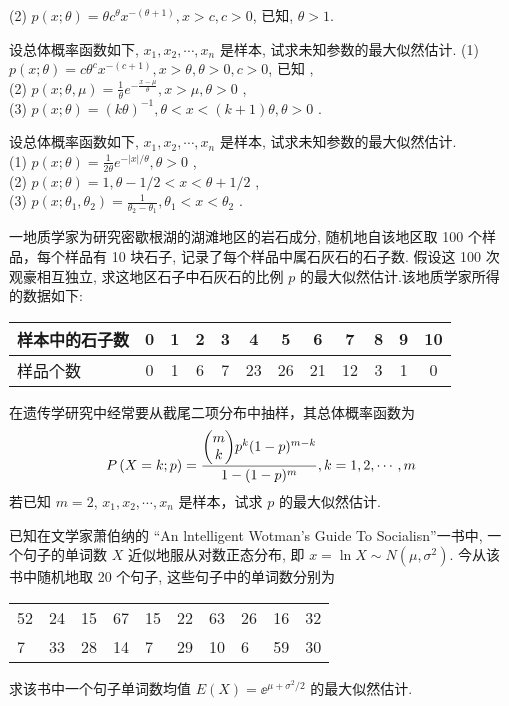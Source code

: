 \begin{xiti}
(2) $p(x ; \theta)=\theta c^{\theta} x^{-(\theta+1)}, x>c, c>0$, 已知,  $\theta>1$.
\item 设总体概率函数如下, $x_1,x_2,\cdots,x_n$ 是样本, 试求未知参数的最大似然估计.
(1) $p(x ; \theta)=c \theta^{c} x^{-(c+1)}, x>\theta, \theta>0, c>0$, 已知 ,\\
(2) $p(x ; \theta, \mu)=\frac{1}{\theta} e^{-\frac{x-\mu}{\theta}}, x>\mu, \theta>0$ ,\\
(3) $p(x ; \theta)=(k \theta)^{-1}, \theta<x<(k+1) \theta, \theta>0$ .
\item 设总体概率函数如下, $x_1,x_2,\cdots,x_n$ 是样本, 试求未知参数的最大似然估计.\\
(1) $p(x ; \theta)=\frac{1}{2\theta} e^{-|x| / \theta}, \theta>0$ ,\\
(2) $p(x ; \theta)=1, \theta-1 / 2<x<\theta+1 / 2$ ,\\
(3) $p\left(x ; \theta_{1}, \theta_{2}\right)=\frac{1}{\theta_{2}-\theta_{1}}, \theta_{1}<x<\theta_{2}$ .
\item 一地质学家为研究密歇根湖的湖滩地区的岩石成分, 随机地自该地区取 100 个样品，每个样品有 10 块石子, 记录了每个样品中属石灰石的石子数. 假设这 100 次观豪相互独立, 求这地区石子中石灰石的比例 $p$ 的最大似然估计.该地质学家所得的数据如下: 
\begin{center}
\begin{tabularx}{0.8\textwidth}{Z|*{10}{c|}|c}
样本中的石子数 & 0 & 1 & 2 & 3 & 4 & 5 & 6 & 7 & 8 & 9 & 10\\\hline
样品个数 & 0 & 1 & 6 & 7 & 23 & 26 & 21 & 12 & 3 & 1 & 0
\end{tabularx}
\end{center}
\item 在遗传学研究中经常要从截尾二项分布中抽样，其总体概率函数为
\[P\left(X=k; p\right)=\frac{\bigg(\begin{array}{@{}c@{}}{m} \\ {k}\end{array}\bigg) p^{k}(1-p)^{m-k}}{1-(1-p)^{m}}, k=1,2, \cdots, m\]
若已知 $m=2$, $x_1,x_2,\cdots,x_n$ 是样本，试求 $p$ 的最大似然估计.
\item 已知在文学家萧伯纳的 “An lntelligent Wotman's Guide To Socialisn”一书中, 一个句子的单词数 $X$ 近似地服从对数正态分布, 即 $x=\ln X\sim N(\mu,\sigma^2)$. 今从该书中随机地取 20 个句子, 这些句子中的单词数分别为
\begin{center}
\begin{tabularx}{0.8\textwidth}{*{10}{Z}}
52 & 24 & 15 & 67 & 15 & 22 & 63 & 26 & 16 & 32\\
7 & 33 & 28 & 14 & 7 & 29 & 10 & 6 & 59 & 30
\end{tabularx}	
\end{center}
求该书中一个句子单词数均值 $E(X)=\ee^{\mu+\sigma^2/2}$ 的最大似然估计.
\end{xiti}

